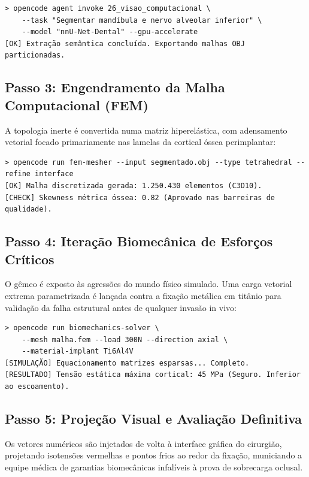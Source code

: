 \begin{lstlisting}[style=bashstyle]
> opencode agent invoke 26_visao_computacional \
    --task "Segmentar mandíbula e nervo alveolar inferior" \
    --model "nnU-Net-Dental" --gpu-accelerate
[OK] Extração semântica concluída. Exportando malhas OBJ particionadas.
\end{lstlisting}

\subsection*{Passo 3: Engendramento da Malha Computacional (FEM)}
A topologia inerte é convertida numa matriz hiperelástica, com adensamento vetorial focado primariamente nas lamelas da cortical óssea perimplantar:

\begin{lstlisting}[style=bashstyle]
> opencode run fem-mesher --input segmentado.obj --type tetrahedral --refine interface
[OK] Malha discretizada gerada: 1.250.430 elementos (C3D10).
[CHECK] Skewness métrica óssea: 0.82 (Aprovado nas barreiras de qualidade).
\end{lstlisting}

\subsection*{Passo 4: Iteração Biomecânica de Esforços Críticos}
O gêmeo é exposto às agressões do mundo físico simulado. Uma carga vetorial extrema parametrizada é lançada contra a fixação metálica em titânio para validação da falha estrutural antes de qualquer invasão in vivo:

\begin{lstlisting}[style=bashstyle]
> opencode run biomechanics-solver \
    --mesh malha.fem --load 300N --direction axial \
    --material-implant Ti6Al4V
[SIMULAÇÃO] Equacionamento matrizes esparsas... Completo.
[RESULTADO] Tensão estática máxima cortical: 45 MPa (Seguro. Inferior ao escoamento).
\end{lstlisting}

\subsection*{Passo 5: Projeção Visual e Avaliação Definitiva}
Os vetores numéricos são injetados de volta à interface gráfica do cirurgião, projetando isotensões vermelhas e pontos frios ao redor da fixação, municiando a equipe médica de garantias biomecânicas infalíveis à prova de sobrecarga oclusal.

